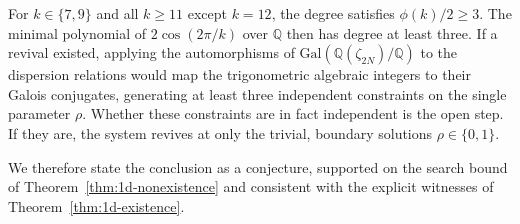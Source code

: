 \begin{remark}
For $k \in \{7, 9\}$ and all $k \ge 11$ except $k = 12$, the
degree satisfies $\phi(k)/2 \ge 3$. The minimal polynomial of
$2\cos(2\pi/k)$ over $\mathbb{Q}$ then has degree at least
three. If a revival existed, applying the automorphisms of
$\mathrm{Gal}(\mathbb{Q}(\zeta_{2N})/\mathbb{Q})$ to the
dispersion relations would map the trigonometric algebraic
integers to their Galois conjugates, generating at least three
independent constraints on the single parameter $\rho$. Whether
these constraints are in fact independent is the open step. If
they are, the system revives at only the trivial, boundary solutions
$\rho \in \{0, 1\}$.

We therefore state the conclusion as a conjecture, supported on
the search bound of Theorem~\ref{thm:1d-nonexistence} and
consistent with the explicit witnesses of
Theorem~\ref{thm:1d-existence}.
\end{remark}
